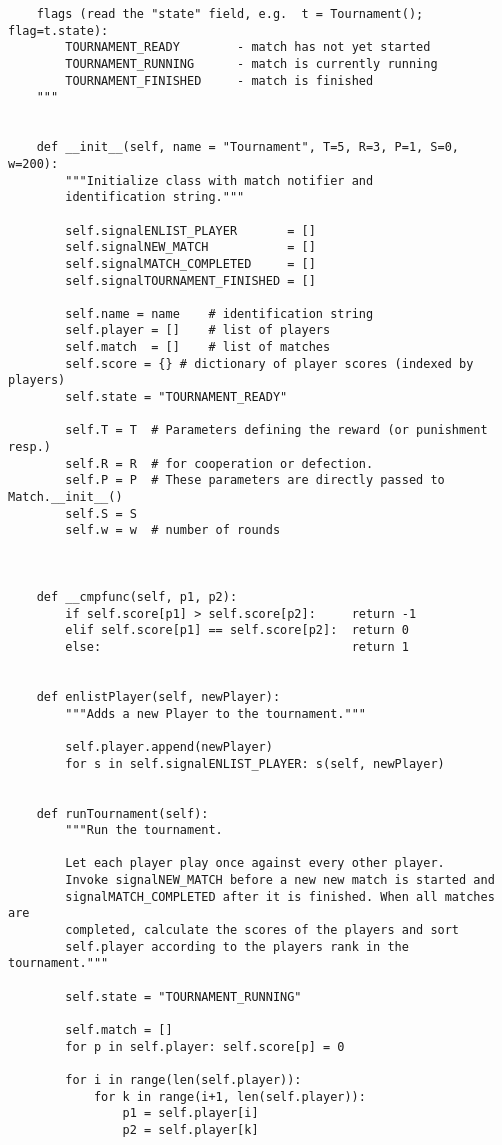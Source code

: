 \documentclass[12pt,a4paper,ngerman]{article}
\begin{document}
\begin{scriptsize}
\begin{verbatim}
    flags (read the "state" field, e.g.  t = Tournament(); flag=t.state):
        TOURNAMENT_READY        - match has not yet started
        TOURNAMENT_RUNNING      - match is currently running
        TOURNAMENT_FINISHED     - match is finished
    """


    def __init__(self, name = "Tournament", T=5, R=3, P=1, S=0, w=200):
        """Initialize class with match notifier and 
        identification string."""

        self.signalENLIST_PLAYER       = []
        self.signalNEW_MATCH           = []
        self.signalMATCH_COMPLETED     = []
        self.signalTOURNAMENT_FINISHED = []
        
        self.name = name    # identification string
        self.player = []    # list of players
        self.match  = []    # list of matches
        self.score = {} # dictionary of player scores (indexed by players)
        self.state = "TOURNAMENT_READY"

        self.T = T  # Parameters defining the reward (or punishment resp.)
        self.R = R  # for cooperation or defection.
        self.P = P  # These parameters are directly passed to Match.__init__()
        self.S = S      
        self.w = w  # number of rounds



    def __cmpfunc(self, p1, p2):
        if self.score[p1] > self.score[p2]:     return -1
        elif self.score[p1] == self.score[p2]:  return 0
        else:                                   return 1


    def enlistPlayer(self, newPlayer):
        """Adds a new Player to the tournament."""

        self.player.append(newPlayer)
        for s in self.signalENLIST_PLAYER: s(self, newPlayer)


    def runTournament(self):
        """Run the tournament.

        Let each player play once against every other player.
        Invoke signalNEW_MATCH before a new new match is started and
        signalMATCH_COMPLETED after it is finished. When all matches are
        completed, calculate the scores of the players and sort
        self.player according to the players rank in the tournament."""

        self.state = "TOURNAMENT_RUNNING"

        self.match = []
        for p in self.player: self.score[p] = 0

        for i in range(len(self.player)):
            for k in range(i+1, len(self.player)):
                p1 = self.player[i]
                p2 = self.player[k]


\end{verbatim}
\end{scriptsize}
\end{document}
